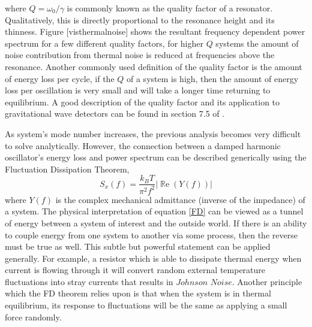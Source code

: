 		where $Q=\omega_{0}/\gamma$ is commonly known as the quality factor of a resonator.  Qualitatively, this is directly proportional to the resonance height and its thinness.  Figure [visthermalnoise] shows the resultant frequency dependent power spectrum for a few different quality factors, for higher $Q$ systems the amount of noise contribution from thermal noise is reduced at frequencies above the resonance.  Another commonly used definition of the quality factor is the amount of energy loss per cycle, if the $Q$ of a system is high, then the amount of energy loss per oscillation is very small and will take a longer time returning to equilibrium.  A good description of the quality factor and its application to gravitational wave detectors can be found in section 7.5 of \cite{Saulson}.
		
		As system's mode number increases, the previous analysis becomes very difficult to solve analytically. However, the connection between a damped harmonic oscillator's energy loss and power spectrum can be described generically using the Fluctuation Dissipation Theorem,
		\begin{equation}\label{FD}
		S_x(f) = \frac{k_B T}{\pi^2 f^2} \vert \operatorname{\mathbb{R}e} (Y(f)) \vert
		\end{equation}
		where $Y(f)$ is the complex mechanical admittance (inverse of the impedance) of a system. The physical interpretation of equation \ref{FD} can be viewed as a tunnel of energy between a system of interest and the outside world.  If there is an ability to couple energy from one system to another via some process, then the reverse must be true as well. This subtle but powerful statement can be applied generally.  For example, a resistor which is able to dissipate thermal energy when current is flowing through it will convert random external temperature fluctuations into stray currents that results in $Johnson$ $Noise$.  Another principle which the FD theorem relies upon is that when the system is in thermal equilibrium, its response to fluctuations will be the same as applying a small force randomly.
		
